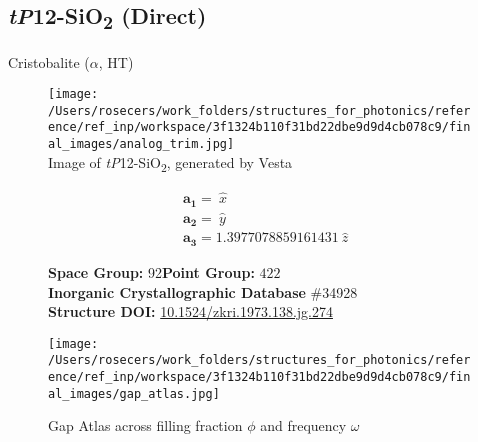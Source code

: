 \subsection{\large{\textit{tP}12-SiO\textsubscript{2} (Direct)}}\vspace{-0.1in}
Cristobalite ($\alpha$, HT)


\begin{figure}[H]
\begin{minipage}{0.34\textwidth}\centering
\texttt{[image: /Users/rosecers/work\_folders/structures\_for\_photonics/reference/ref\_inp/workspace/3f1324b110f31bd22dbe9d9d4cb078c9/final\_images/analog\_trim.jpg]}\\
\small{Image of \textit{tP}12-SiO\textsubscript{2}, generated by Vesta}
\end{minipage}\hfill
\begin{minipage}{0.65\textwidth}\raggedright
{\setlength{\mathindent}{0cm}
\begin{equation*}
\begin{split}&\boldsymbol{a_1} = \ \hat{x}\\[-8pt]
&\boldsymbol{a_2} = \ \hat{y}\\[-8pt]
&\boldsymbol{a_3} = 1.3977078859161431\ \hat{z}
\end{split}
\end{equation*}}

\textbf{Space Group:}	92\hspace{0.5in}\textbf{Point Group:}	$422$\\
\textbf{Inorganic Crystallographic Database} \#34928\\
\textbf{Structure DOI: }\url{10.1524/zkri.1973.138.jg.274}

\end{minipage}\hfill
\end{figure}
\vspace{-0.25in}


\begin{figure}[H]
\begin{minipage}{0.9\textwidth}\centering
\texttt{[image: /Users/rosecers/work\_folders/structures\_for\_photonics/reference/ref\_inp/workspace/3f1324b110f31bd22dbe9d9d4cb078c9/final\_images/gap\_atlas.jpg]}
\\
\end{minipage}\hfill\caption{Gap Atlas across filling fraction $\phi$ and frequency $\omega$}
\end{figure}


